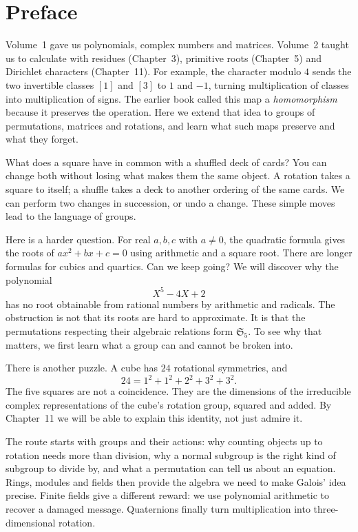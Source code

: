 \chapter*{Preface}

Volume~1 gave us polynomials, complex numbers and matrices. Volume~2 taught
us to calculate with residues (Chapter~3), primitive roots (Chapter~5) and Dirichlet characters (Chapter~11).
For example, the character modulo $4$ sends the two invertible classes $[1]$
and $[3]$ to $1$ and $-1$, turning multiplication of classes into
multiplication of signs. The earlier book called this map a
\emph{homomorphism} because it preserves the operation. Here we extend
that idea to groups of permutations, matrices and rotations, and learn
what such maps preserve and what they forget.

What does a square have in common with a shuffled deck of cards? You can change both without losing what makes them the same object. A rotation takes a square to itself; a shuffle takes a deck to another ordering of the same cards. We can perform two changes in succession, or undo a change. These simple moves lead to the language of groups.

Here is a harder question. For real $a,b,c$ with $a\ne0$, the quadratic
formula gives the roots of $ax^2+bx+c=0$ using arithmetic and a square root.
There are longer formulas for cubics and quartics. Can we keep going?
We will discover why the polynomial
\[
X^5-4X+2
\]
has no root obtainable from rational numbers by arithmetic and radicals.
The obstruction is not that its roots are hard to approximate. It is that
the permutations respecting their algebraic relations form $\mathfrak S_5$.
To see why that matters, we first learn what a group can and cannot be broken into.

There is another puzzle. A cube has $24$ rotational symmetries, and
\[
24=1^2+1^2+2^2+3^2+3^2.
\]
The five squares are not a coincidence. They are the dimensions of the irreducible complex representations of the cube's rotation group, squared and added. By Chapter~11 we will be able to explain this identity, not just admire it.

The route starts with groups and their actions: why counting objects up to rotation needs more than division, why a normal subgroup is the right kind of subgroup to divide by, and what a permutation can tell us about an equation. Rings, modules and fields then provide the algebra we need to make Galois' idea precise. Finite fields give a different reward: we use polynomial arithmetic to recover a damaged message. Quaternions finally turn multiplication into three-dimensional rotation.

